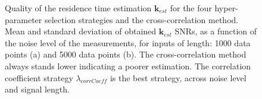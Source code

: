 \documentclass[]{elsarticle} %
\begin{document}
\begin{figure}[H]
    \centering
    \caption{Quality of the residence time estimation $\textbf{k}_{est}$ for the four hyper-parameter selection strategies and the cross-correlation method. Mean and standard deviation of obtained $\textbf{k}_{est}$ SNRs, as a function of the noise level of the measurements, for inputs of length: 1000 data points (a) and 5000 data points (b). The cross-correlation method always stands lower indicating a poorer estimation. The correlation coefficient strategy $\lambda_{corrCoeff}$ is the best strategy, across noise level and signal length.}
    \label{fig_hyper_parameter_choice_strategy}
\end{figure}
\end{document}
